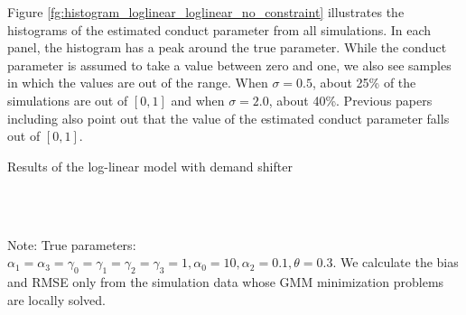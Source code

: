 \documentclass[11pt, a4paper]{article}
\begin{document}
Figure \ref{fg:histogram_loglinear_loglinear_no_constraint} illustrates the histograms of the estimated conduct parameter from all simulations.
In each panel, the histogram has a peak around the true parameter.
While the conduct parameter is assumed to take a value between zero and one, we also see samples in which the values are out of the range. 
When $\sigma = 0.5$, about 25\% of the simulations are out of $[0,1]$ and when $\sigma = 2.0$, about 40\%. 
Previous papers including \citet{okazaki2022excess} also point out that the value of the estimated conduct parameter falls out of $[0,1]$.

\begin{table}[!htbp]
      \begin{center}
          \caption{Results of the log-linear model with demand shifter}
          \label{tb:loglinear_loglinear_non_constraint} 
          \subfloat[$\sigma=0.001$]{}\\
          \subfloat[$\sigma=0.5$]{}\\
            \subfloat[$\sigma=2.0$]{}
      \end{center}\footnotesize
      Note: True parameters: $\alpha_1 = \alpha_3 = \gamma_0 = \gamma_1 = \gamma_2  = \gamma_3 = 1, \alpha_0 = 10, \alpha_2 = 0.1,  \theta = 0.3.$ We calculate the bias and RMSE only from the simulation data whose GMM minimization problems are locally solved.  
\end{table} 
\end{document}
